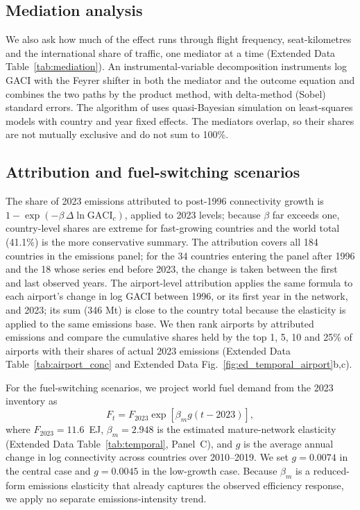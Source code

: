 \documentclass[12pt]{extarticle}
\begin{document}
\subsection*{Mediation analysis}

We also ask how much of the effect runs through flight frequency, seat-kilometres and the international share of traffic, one mediator at a time (Extended Data Table~\ref{tab:mediation}). An instrumental-variable decomposition instruments log GACI with the Feyrer shifter in both the mediator and the outcome equation and combines the two paths by the product method, with delta-method (Sobel) standard errors. The algorithm of \citet{imai2010} uses quasi-Bayesian simulation on least-squares models with country and year fixed effects. The mediators overlap, so their shares are not mutually exclusive and do not sum to 100\%.

\subsection*{Attribution and fuel-switching scenarios}
The share of 2023 emissions attributed to post-1996 connectivity growth is
$1 - \exp(-\beta\,\Delta \ln \mathrm{GACI}_c)$, applied to 2023 levels;
because $\beta$ far exceeds one, country-level shares are extreme for
fast-growing countries and the world total (41.1\%) is the more
conservative summary. The attribution covers all 184 countries in the emissions panel; for the 34 countries entering the panel after 1996 and the 18 whose series end before 2023, the change is taken between the first and last observed years. The airport-level attribution applies the same
formula to each airport's change in log GACI between 1996, or its first
year in the network, and 2023; its sum (346 Mt) is close to the country
total because the elasticity is applied to the same emissions base. We then rank airports by attributed emissions and compare the cumulative shares held by the top 1, 5, 10 and 25\% of airports with their shares of actual 2023 emissions (Extended Data Table~\ref{tab:airport_conc} and Extended Data Fig.~\ref{fig:ed_temporal_airport}b,c).

For the fuel-switching scenarios, we project world fuel demand from the
2023 inventory as
\begin{equation}
F_t=F_{2023}\exp[\beta_m g(t-2023)],
\end{equation}
where $F_{2023}=11.6$~EJ, $\beta_m=2.948$ is the estimated
mature-network elasticity (Extended Data Table~\ref{tab:temporal},
Panel~C), and $g$ is the average annual change in log connectivity
across countries over 2010--2019. We set $g=0.0074$ in the central
case and $g=0.0045$ in the low-growth case. Because $\beta_m$ is a
reduced-form emissions elasticity that already captures the observed
efficiency response, we apply no separate emissions-intensity trend.
\end{document}
